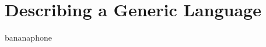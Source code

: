 \section{Describing a Generic Language}

\begin{code}%
\>[0]\AgdaSpace{}%
\AgdaSpace{}%
\AgdaSymbol{(}\AgdaSpace{}%
\AgdaSymbol{:}\AgdaSpace{}%
\AgdaSymbol{)}\AgdaSpace{}%
\<%
\end{code}

bananaphone
